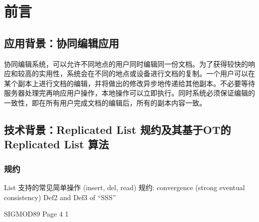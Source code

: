 \chapter{前言}
\section{应用背景：协同编辑应用}
	\par 协同编辑系统，可以允许不同地点的用户同时编辑同一份文档。为了获得较快的响应和较高的实用性，系统会在不同的地点或设备进行文档的复制。一个用户可以在某个副本上进行文档的编辑，并将做出的修改异步地传递给其他副本。不必要等待服务器处理完再响应用户操作，本地操作可以立即执行。同时系统必须保证编辑的一致性，即在所有用户完成文档的编辑后，所有的副本内容一致。

\section{技术背景：Replicated List 规约及其基于OT的 Replicated List 算法}

\subsection{规约}
List 支持的常见简单操作 (insert, del, read)
\cite{ellis1989concurrency}
规约: convergence (strong eventual consistency)
Def2 and Def3 of ``SSS''

SIGMOD89 Page 4
1
